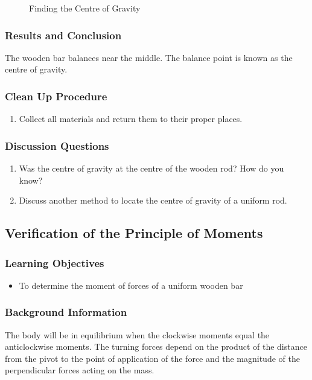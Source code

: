 \begin{figure}
\begin{center}
\def\svgwidth{175pt}

\caption{Finding the Centre of Gravity}
\label{fig:center-of-gravity}
\end{center}
\end{figure}

\subsubsection*{Results and Conclusion}
The wooden bar balances near the middle. The balance point is known as the centre of gravity.  

\subsubsection*{Clean Up Procedure}
\begin{enumerate}
\item{Collect all materials and return them to their proper places.} 
\end{enumerate}

\subsubsection*{Discussion Questions}
\begin{enumerate}
\item{Was the centre of gravity at the centre of the wooden rod? How do you know?}
\item{Discuss another method to locate the centre of gravity of a uniform rod.} 
\end{enumerate}

\subsection{Verification of the Principle of Moments}

\subsubsection*{Learning Objectives}
\begin{itemize}
\item{To determine the moment of forces of a uniform wooden bar}
\end{itemize}

\subsubsection*{Background Information}
The body will be in equilibrium when the clockwise moments equal the anticlockwise moments. The turning forces depend on the product of the distance from the pivot to the point of application of the force and the magnitude of the perpendicular forces acting on the mass.  

